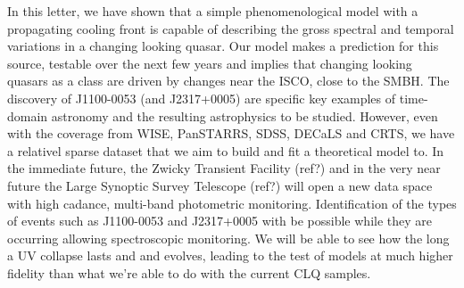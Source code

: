 \documentclass{nature}
\begin{document}
In this letter, we have shown that a simple phenomenological model with a propagating cooling front is capable of describing the gross spectral and temporal variations in a changing looking quasar. Our model makes a prediction for this source, testable over the next few years and implies that changing looking quasars as a class are driven by changes near the ISCO, close to the SMBH. The discovery of J1100-0053 (and  J2317+0005) are specific key examples of time-domain astronomy and the resulting astrophysics to be studied. However, even with the coverage from WISE, PanSTARRS, SDSS, DECaLS and CRTS, we have a relativel sparse dataset that we aim to build and fit a theoretical model to. In the immediate future, the Zwicky Transient Facility (ref?) and in the very near future the Large Synoptic Survey Telescope (ref?) will open a new data space with high cadance, multi-band photometric monitoring. Identification of the types of events such as J1100-0053 and  J2317+0005 with be possible while they are occurring allowing spectroscopic monitoring. We will be able to see how the long a UV collapse lasts and and evolves, leading to the test of models at much higher fidelity than what we're able to do with the current CLQ samples.




%

\end{document}
